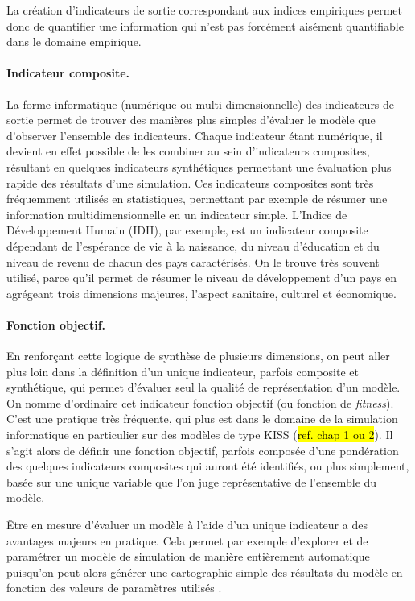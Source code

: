 La création d'indicateurs de sortie correspondant aux indices empiriques permet donc de quantifier une information qui n'est pas forcément aisément quantifiable dans le domaine empirique.

\paragraph{Indicateur composite.}

La forme \og informatique\fg{} (numérique ou multi-dimensionnelle) des indicateurs de sortie permet de trouver des manières plus simples d'évaluer le modèle que d'observer l'ensemble des indicateurs.
Chaque indicateur étant numérique, il devient en effet possible de les combiner au sein d'indicateurs composites, résultant en quelques indicateurs synthétiques permettant une évaluation plus rapide des résultats d'une simulation.
Ces indicateurs composites sont très fréquemment utilisés en statistiques, permettant par exemple de résumer une information multidimensionnelle en un indicateur simple.
L'Indice de Développement Humain (IDH), par exemple, est un indicateur composite dépendant de l'espérance de vie à la naissance, du niveau d'éducation et du niveau de revenu de chacun des pays caractérisés.
On le trouve très souvent utilisé, parce qu'il permet de résumer le niveau de développement d'un pays en agrégeant trois dimensions majeures, l'aspect sanitaire, culturel et économique.

\paragraph{Fonction objectif.}

En renforçant cette logique de synthèse de plusieurs dimensions, on peut aller plus loin dans la définition d'un unique indicateur, parfois composite et synthétique, qui permet d'évaluer seul la qualité de représentation d'un modèle.
On nomme d'ordinaire cet indicateur \og fonction objectif\fg{} (ou \og fonction de \textit{fitness}\fg{}).
C'est une pratique très fréquente, qui plus est dans le domaine de la simulation informatique en particulier sur des modèles de type \og KISS\fg{} (\hl{ref. chap 1 ou 2}).
Il s'agit alors de définir une \og fonction objectif\fg{}, parfois composée d'une pondération des quelques indicateurs composites qui auront été identifiés, ou plus simplement, basée sur une unique variable que l'on juge représentative de l'ensemble du modèle.

Être en mesure d'évaluer un modèle à l'aide d'un unique indicateur a des avantages majeurs en pratique.
Cela permet par exemple d'explorer et de paramétrer un modèle de simulation de manière entièrement automatique puisqu'on peut alors générer une cartographie simple des résultats du modèle en fonction des valeurs de paramètres utilisés \autocite[voir][par exemple]{cherel_beyond_2015}.

